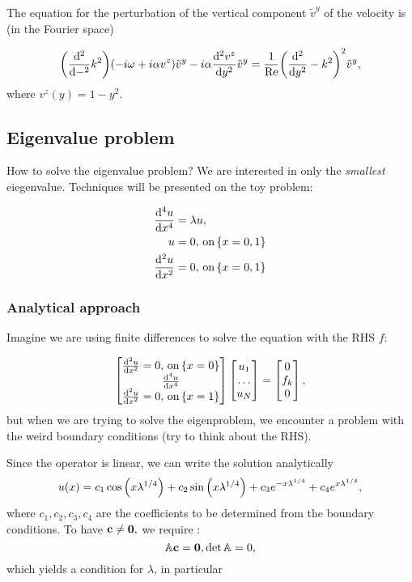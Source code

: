 \documentclass[reqno, a4paper]{article}
\begin{document}
The equation for the perturbation of the vertical component $\tilde{v}^y$ of the velocity is (in the Fourier space)

\[
	\qty(\dv[2]-k^{2})\qty(-i \omega + i \alpha v^z)\tilde{v}^y - i \alpha \dv[2]{v^z}{y}\tilde{v}^y = \frac{1}{\mathrm{Re}}\qty(\dv[2]{y}-k^{2})^{2} \tilde{v}^y,
\]
where $v^z(y) = 1-y^{2}.$



\subsection{Eigenvalue problem}
\label{sec:eigenproblem}
How to solve the eigenvalue problem? We are interested in only the \textit{smallest} eiegenvalue. Techniques will be presented on the toy problem:

\begin{align*}
	\dv[4]{u}{x} &= \lambda u, \\
	u &= 0, \, \text{on} \, \qty{x = 0,1}\\
	\dv[2]{u}{x} &= 0, \, \text{on} \, \qty{x = 0,1}
\end{align*}

\subsubsection{Analytical approach}
\label{sec:analytical_approoach}

Imagine we are using finite differences to solve the equation with the RHS $f$:

\[
	\begin{bmatrix}
		\dv[2]{u}{x} = 0, \, \text{on} \, \qty{x = 0} \\
		\dv[4]{u}{x} \\
		\dv[2]{u}{x} = 0, \, \text{on} \, \qty{x = 1} \\
	\end{bmatrix}
	\begin{bmatrix}
		u_1 \\
		\dots \\
		u_N
	\end{bmatrix}
	=
	\begin{bmatrix}
		0 \\
		f_k \\
		0
	\end{bmatrix},
\]
but when we are trying to solve the eigenproblem, we encounter a problem with the weird boundary conditions (try to think about the RHS).

Since the operator is linear, we can write the solution analytically
\[
	u(x) = c_1 \cos\qty(x \lambda^{1/4}) + c_2 \sin\qty(x \lambda^{1/4}) + c_3 e^{-x \lambda^{1/4}} + c_4 e^{x \lambda^{1/4}},
\]
where $c_1, c_2, c_3, c_4$ are the coefficients to be determined from the boundary conditions. To have $\vb{c} \neq \vb{0},$ we require :
\[
	\mathbb{A} \vb{c} = \vb{0}, \det \mathbb{A} = 0,
\]
which yields a condition for $\lambda$, in particular
\end{document}
